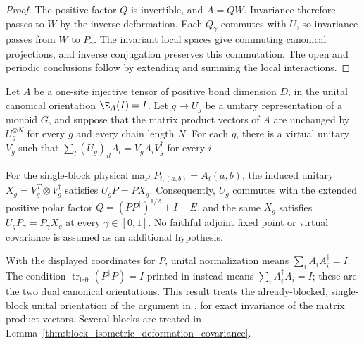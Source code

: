 \begin{proof}
    \leanok
    The positive factor $Q$ is invertible, and $A=QW$. Invariance
    therefore passes to $W$ by the inverse deformation. Each
    $Q_\gamma$ commutes with $U$, so invariance passes from $W$ to
    $P_\gamma$. The invariant local spaces give commuting canonical
    projections, and inverse conjugation preserves this commutation.
    The open and periodic conclusions follow by extending and summing
    the local interactions.
\end{proof}

\begin{lemma}
    \label{thm:injective_isometric_deformation_derived_covariance}
    \leanok
    Let $A$ be a one-site injective tensor of positive bond dimension
    $D$, in the unital canonical orientation $\E_A(I)=I$. Let
    $g\mapsto U_g$ be a unitary
    representation of a monoid $G$, and suppose that the matrix product
    vectors of $A$ are unchanged by $U_g^{\otimes N}$ for every $g$ and
    every chain length $N$. For each $g$, there is a virtual unitary
    $V_g$ such that
    $\sum_l(U_g)_{il}A_l=V_gA_iV_g^\dagger$ for every $i$.

    For the single-block physical map $P_{i,(a,b)}=A_i(a,b)$, the induced
    unitary $X_g=V_g^T\otimes V_g^\dagger$ satisfies $U_gP=PX_g$.
    Consequently, $U_g$ commutes with the extended positive polar factor
    $Q=(PP^\dagger)^{1/2}+I-E$, and the same $X_g$ satisfies
    $U_gP_\gamma=P_\gamma X_g$ at every $\gamma\in[0,1]$.
    No faithful adjoint fixed point or virtual covariance is assumed
    as an additional hypothesis.

    With the displayed coordinates for $P$, unital normalization means
    $\sum_iA_iA_i^\dagger=I$. The condition
    $\operatorname{tr}_{\mathrm{left}}(P^\dagger P)=I$ printed in
    \cite[line~653]{Schuch2011Phases} instead means
    $\sum_iA_i^\dagger A_i=I$; these are the two dual canonical
    orientations. This result treats the already-blocked, single-block
    unital orientation of the argument in
    \cite[lines~645--676]{Schuch2011Phases}, for exact invariance of
    the matrix product vectors. Several blocks are treated in
    Lemma~\ref{thm:block_isometric_deformation_covariance}.
\end{lemma}

